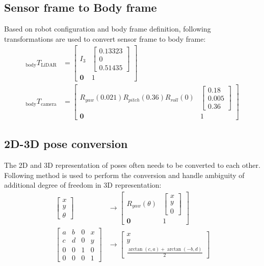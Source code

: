 \documentclass[conference]{IEEEtran}
\begin{document}
\subsection{Sensor frame to Body frame}
Based on robot configuration and body frame definition, 
following transformations are used to convert sensor frame to body frame:
$$
\begin{aligned}
    {}_{\text{body} }T_{\text{LiDAR} }
        &=\left[ \begin{matrix}I_{3}&\left[ \begin{gathered}0.13323\\ 0\\ 0.51435\end{gathered} \right]  \\ \mathbf{0}&1\end{matrix} \right]  \\ 
    {}_{\text{body} }T_{\text{camera} }
        &=\left[ \begin{matrix}R_{yaw}\left( 0.021\right)  R_{pitch}\left( 0.36\right)  R_{roll}\left( 0\right)  &\left[ \begin{gathered}0.18\\ 0.005\\ 0.36\end{gathered} \right]  \\ \mathbf{0}&1\end{matrix} \right]  
\end{aligned} 
$$

\subsection{2D-3D pose conversion}
The 2D and 3D representation of poses often needs to be converted to each other.
Following method is used to perform the conversion and handle
ambiguity of additional degree of freedom in 3D representation:
$$
\begin{aligned}
    \left[ \begin{gathered}x\\ y\\ \theta \end{gathered} \right]  
        &\rightarrow \left[ \begin{matrix}R_{yaw}(\theta )&\left[ \begin{gathered}x\\ y\\ 0\end{gathered} \right]  \\ \mathbf{0}&1\end{matrix} \right] \\
    \left[ \begin{matrix}a&b&0&x\\ c&d&0&y\\ 0&0&1&0\\ 0&0&0&1\end{matrix} \right]  
        &\rightarrow \left[ \begin{gathered}x\\ y\\ \frac{\arctan (c,a)+\arctan (-b,d)}{2} \end{gathered} \right]
\end{aligned} 
$$
\end{document}
